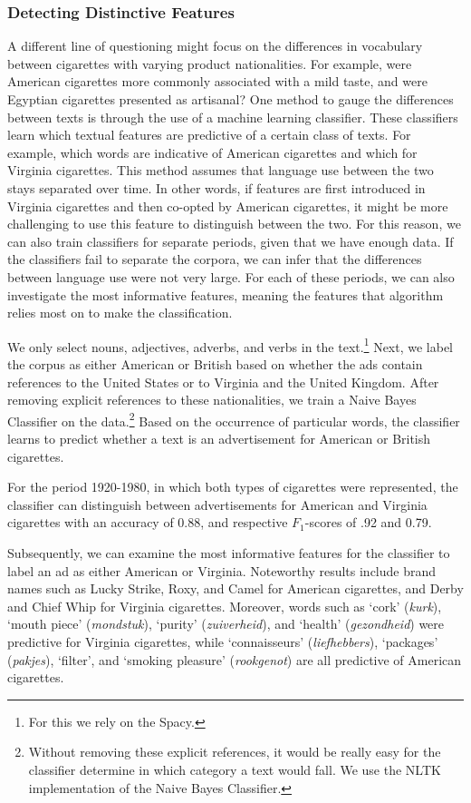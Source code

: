 \documentclass[USenglish]{article}
\begin{document}
\subsubsection{Detecting Distinctive Features}
A different line of questioning might focus on the differences in vocabulary between cigarettes with varying product nationalities. For example, were American cigarettes more commonly associated with a mild taste, and were Egyptian cigarettes presented as artisanal? 
%
One method to gauge the differences between texts is through the use of a machine learning classifier. These classifiers learn which textual features are predictive of a certain class of texts. For example, which words are indicative of American cigarettes and which for Virginia cigarettes. This method assumes that language use between the two stays separated over time. In other words, if features are first introduced in Virginia cigarettes and then co-opted by American cigarettes, it might be more challenging to use this feature to distinguish between the two. For this reason, we can also train classifiers for separate periods, given that we have enough data. If the classifiers fail to separate the corpora, we can infer that the differences between language use were not very large. For each of these periods, we can also investigate the most informative features, meaning the features that algorithm relies most on to make the classification.

We only select nouns, adjectives, adverbs, and verbs in the text.\footnote{For this we rely on the Spacy.} Next, we label the corpus as either American or British based on whether the ads contain references to the United States or to Virginia and the United Kingdom. After removing explicit references to these nationalities, we train a Naive Bayes Classifier on the data.\footnote{Without removing these explicit references, it would be really easy for the classifier determine in which category a text would fall. We use the NLTK implementation of the Naive Bayes Classifier.} Based on the occurrence of particular words, the classifier learns to predict whether a text is an advertisement for American or British cigarettes.

For the period 1920-1980, in which both types of cigarettes were represented, the classifier can distinguish between advertisements for American and Virginia cigarettes with an accuracy of 0.88, and respective $F_{1}$-scores of .92 and 0.79.  

Subsequently, we can examine the most informative features for the classifier to label an ad as either American or Virginia. Noteworthy results include brand names such as Lucky Strike, Roxy, and Camel for American cigarettes, and Derby and Chief Whip for Virginia cigarettes. Moreover, words such as `cork' (\textit{kurk}), `mouth piece' (\textit{mondstuk}), `purity' (\textit{zuiverheid}), and `health' (\textit{gezondheid}) were predictive for Virginia cigarettes, while `connaisseurs' (\textit{liefhebbers}), `packages' (\textit{pakjes}), `filter', and `smoking pleasure' (\textit{rookgenot}) are all predictive of American cigarettes.
\end{document}
